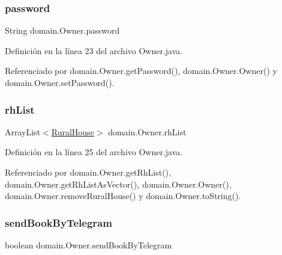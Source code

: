 \mbox{\label{classdomain_1_1_owner_af66aee27508c675e6f8cab193f0c215d}} 
\subsubsection{\texorpdfstring{password}{password}}
{\footnotesize\ttfamily String domain.\+Owner.\+password\hspace{0.3cm}{\ttfamily [private]}}



Definición en la línea 23 del archivo Owner.\+java.



Referenciado por domain.\+Owner.\+get\+Password(), domain.\+Owner.\+Owner() y domain.\+Owner.\+set\+Password().

\mbox{\label{classdomain_1_1_owner_afcb9d273bad9eff1c21fcc0f8be6611a}} 
\subsubsection{\texorpdfstring{rhList}{rhList}}
{\footnotesize\ttfamily Array\+List$<$\mbox{\hyperlink{classdomain_1_1_rural_house}{Rural\+House}}$>$ domain.\+Owner.\+rh\+List\hspace{0.3cm}{\ttfamily [private]}}



Definición en la línea 25 del archivo Owner.\+java.



Referenciado por domain.\+Owner.\+get\+Rh\+List(), domain.\+Owner.\+get\+Rh\+List\+As\+Vector(), domain.\+Owner.\+Owner(), domain.\+Owner.\+remove\+Rural\+House() y domain.\+Owner.\+to\+String().

\mbox{\label{classdomain_1_1_owner_a134e9113c7b9ebcc36663b40d2415089}} 
\subsubsection{\texorpdfstring{sendBookByTelegram}{sendBookByTelegram}}
{\footnotesize\ttfamily boolean domain.\+Owner.\+send\+Book\+By\+Telegram\hspace{0.3cm}{\ttfamily [private]}}



